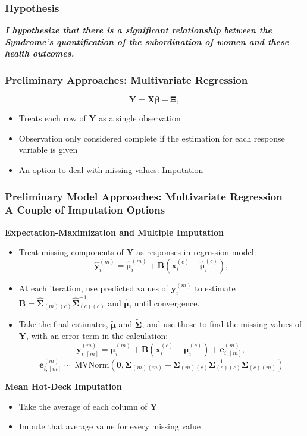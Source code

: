\documentclass{beamer}
\begin{document}
\begin{frame}
\frametitle{Hypothesis}
\textbf{\textit{I hypothesize that there is a significant relationship between the Syndrome's quantification of the subordination of women and these health outcomes.}}
\end{frame}

\begin{frame}
\frametitle{Preliminary Approaches: Multivariate Regression}
\begin{equation}
\mathbf{Y} = \mathbf{X}\boldsymbol{\beta} + \boldsymbol{\Xi},
\end{equation}
\begin{itemize}
\item Treats each row of $\mathbf{Y}$ as a single observation
\item Observation only considered complete if the estimation for each response variable is given 
\item An option to deal with missing values: Imputation
\end{itemize}
\end{frame}

\begin{frame}
\frametitle{Preliminary Model Approaches: Multivariate Regression \\ \normalsize{A Couple of Imputation Options}}
\footnotesize
\textbf{Expectation-Maximization and Multiple Imputation}
\begin{itemize}
\item Treat missing components of $\mathbf{Y}$ as responses in regression model:
\begin{equation}
\hat{\mathbf{y}}_i^{(m)} = \hat{\boldsymbol{\mu}}_i^{(m)} + \mathbf{B} (\mathbf{x}_i^{(c)} - \hat{\boldsymbol{\mu}}_i^{(c)}),
\end{equation}
\item At each iteration, use predicted values of $\mathbf{y}_i^{(m)}$ to estimate $\mathbf{B}=\hat{\boldsymbol{\Sigma}}_{(m)(c)}\hat{\boldsymbol{\Sigma}}_{(c)(c)}^{-1}$ and $\hat{\boldsymbol{\mu}}$, until convergence.
\item Take the final estimates, $\tilde{\boldsymbol{\mu}}$ and $\tilde{\boldsymbol{\Sigma}}$, and use those to find the missing values of $\mathbf{Y}$, with an error term in the calculation:
\begin{equation}
\mathbf{y}_{i,[m]}^{(m)} = \boldsymbol{\mu}_i^{(m)} + \mathbf{B} (\mathbf{x}_i^{(c)} - \boldsymbol{\mu}_i^{(c)}) + \mathbf{e}_{i,[m]}^{(m)} \text{, } 
\end{equation}
\begin{equation}
\mathbf{e}_{i,[m]}^{(m)} \sim\ \text{MVNorm}(\mathbf{0},\boldsymbol{\Sigma}_{(m)(m)}-\boldsymbol{\Sigma}_{(m)(c)}\boldsymbol{\Sigma}_{(c)(c)}^{-1}\boldsymbol{\Sigma}_{(c)(m)})
\end{equation}
\end{itemize}
\textbf{Mean Hot-Deck Imputation}
\begin{itemize}
\item Take the average of each column of $\mathbf{Y}$ 
\item Impute that average value for every missing value
\end{itemize}
\end{frame}
\end{document}
